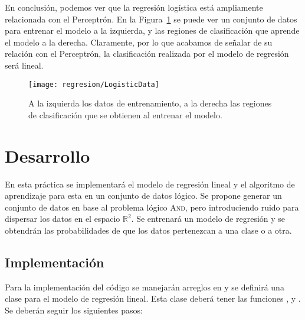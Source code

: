 En conclusión, podemos ver que la regresión logística está ampliamente relacionada con el Perceptrón. En la Figura~\ref{Fig:LogistData} se puede ver un conjunto de datos para entrenar el modelo a la izquierda, y las regiones de clasificación que aprende el modelo a la derecha. Claramente, por lo que acabamos de señalar de su relación con el Perceptrón, la clasificación realizada por el modelo de regresión será lineal.

\begin{figure}
 \centering
 \texttt{[image: regresion/LogisticData]}
 \caption{A la izquierda los datos de entrenamiento, a la derecha las regiones de clasificación que se obtienen al entrenar el modelo.}\label{Fig:LogistData}
\end{figure}






\section{Desarrollo}

En esta práctica se implementará el modelo de regresión lineal y el algoritmo de aprendizaje para esta en un conjunto de datos lógico. Se propone generar un conjunto de datos en base al problema lógico \textsc{And}, pero introduciendo ruido para dispersar los datos en el espacio $\mathbb{R}^2$. Se entrenará un modelo de regresión y se obtendrán las probabilidades de que los datos pertenezcan a una clase o a otra.



\subsection{Implementación}

Para la implementación del código se manejarán arreglos en  y se definirá una clase para el modelo de regresión lineal. Esta clase deberá tener las funciones ,  y . Se deberán seguir los siguientes pasos:


